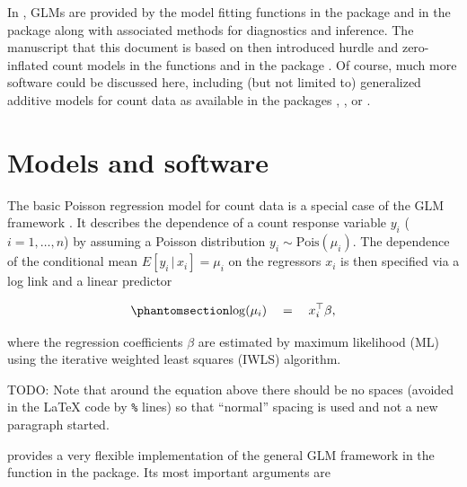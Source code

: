 \documentclass[
  nojss,
  article]{jss}
\newcommand{\fct}[1]{\code{#1()}}
\begin{document}
In  \citet{R}, GLMs are provided by the model fitting
functions \fct{glm} in the  package and \fct{glm.nb} in the
 package \citep{VenablesRipley2002} along with associated
methods for diagnostics and inference. The manuscript that this document
is based on \citep{ZeileisKleiberJackman2008} then introduced hurdle and
zero-inflated count models in the functions \fct{hurdle} and
\fct{zeroinfl} in the  package \citet{Jackman2015}. Of course,
much more software could be discussed here, including (but not limited
to) generalized additive models for count data as available in the
 packages  \citet{Wood2006}, 
\citet{StasinopoulosRigby2007}, or  \citet{Yee2009}.

\section{Models and software}\label{sec-models}

The basic Poisson regression model for count data is a special case of
the GLM framework \citet{McCullaghNelder1989}. It describes the
dependence of a count response variable \(y_i\) (\(i = 1, \dots, n\)) by
assuming a Poisson distribution \(y_i \sim \mathrm{Pois}(\mu_i)\). The
dependence of the conditional mean \(E[y_i \, | \, x_i] = \mu_i\) on the
regressors \(x_i\) is then specified via a log link and a linear
predictor

\begin{equation}\phantomsection\label{eq-mean}{
\log(\mu_i) \quad = \quad x_i^\top \beta,
}\end{equation}

where the regression coefficients \(\beta\) are estimated by maximum
likelihood (ML) using the iterative weighted least squares (IWLS)
algorithm.

\begin{tcolorbox}[enhanced jigsaw, bottomrule=.15mm, breakable, toprule=.15mm, opacityback=0, colframe=quarto-callout-color-frame, left=2mm, rightrule=.15mm, arc=.35mm, leftrule=.75mm, colback=white]

TODO: Note that around the equation above there should be no spaces
(avoided in the {\LaTeX} code by \texttt{\%} lines) so that ``normal''
spacing is used and not a new paragraph started.

\end{tcolorbox}

 provides a very flexible implementation of the general GLM
framework in the function \fct{glm} \citet{ChambersHastie1992} in the
 package. Its most important arguments are
\end{document}
